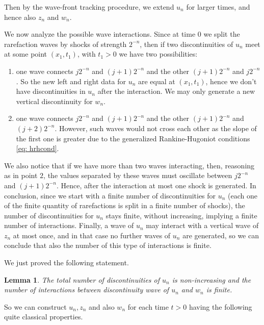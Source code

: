 \documentclass[12pt]{article}
\newcommand{\RH}{Rankine-Hugoniot }
\newcommand{\1}{\mathds{1}}
\newtheorem{lem}[teo]{Lemma}
\theoremstyle{definition}
\begin{document}
Then by the wave-front tracking procedure, we extend $u_n$ for larger times, and hence also $z_n$ and $w_n$. \par
We now analyze the possible wave interactions. Since at time $0$ we split the rarefaction waves by shocks of strength $2^{-n}$, then if two discontinuities of $u_n$ meet at some point $(x_1,t_1)$, with $t_1>0$ we have two possibilities: \begin{enumerate}
    \item one wave connects $j 2^{-n}$ and $(j+1) 2^{-n}$ and the other $(j+1) 2^{-n}$ and $j 2^{-n}$. So the new left and right data for $u_n$ are equal at $(x_1,t_1)$, hence we don't have discontinuities in $u_n$ after the interaction. We may only generate a new vertical discontinuity for $w_n$.
    \item one wave connects $j 2^{-n}$ and $(j+1) 2^{-n}$ and the other $(j+1) 2^{-n}$ and $(j+2) 2^{-n}$. However, such waves would not cross each other as the slope of the first one is greater due to the generalized \RH conditions \eqref{eq: hrhcond}. 
\end{enumerate}
We also notice that if we have more than two waves interacting, then, reasoning as in point $2$, the values separated by these waves must oscillate between $j 2^{-n}$ and $(j+1)2^{-n}$. Hence, after the interaction at most one shock is generated. In conclusion, since we start with a finite number of discontinuities for $u_n$ (each one of the finite quantity of rarefactions is split in a finite number of shocks), the number of discontinuities for $u_n$ stays finite, without increasing, implying a finite number of interactions. Finally, a wave of $u_n$ may interact with a vertical wave of $z_n$ at most once, and in that case no further waves of $u_n$ are generated, so we can conclude that also the number of this type of interactions is finite.\par 
We just proved the following statement. \begin{lem}\label{lemma: ndisc}
    The total number of discontinuities of $u_n$ is non-increasing and the number of interactions between discontinuity wave of $u_n$ and $w_n$ is finite. 
\end{lem}

So we can construct $u_n,z_n$ and also $w_n$ for each time $t>0$ having the following quite classical properties.
\end{document}
